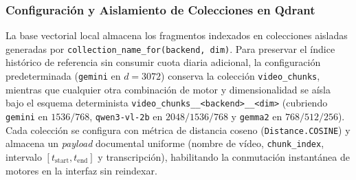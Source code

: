 \subsubsection{Configuración y Aislamiento de Colecciones en Qdrant}
La base vectorial local almacena los fragmentos indexados en colecciones aisladas generadas por \texttt{collection\_name\_for(backend, dim)}. Para preservar el índice histórico de referencia sin consumir cuota diaria adicional, la configuración predeterminada (\texttt{gemini} en $d=3072$) conserva la colección \texttt{video\_chunks}, mientras que cualquier otra combinación de motor y dimensionalidad se aísla bajo el esquema determinista \texttt{video\_chunks\_\_<backend>\_\_<dim>} (cubriendo \texttt{gemini} en $1536/768$, \texttt{qwen3-vl-2b} en $2048/1536/768$ y \texttt{gemma2} en $768/512/256$). Cada colección se configura con métrica de distancia coseno (\texttt{Distance.COSINE}) y almacena un \textit{payload} documental uniforme (nombre de vídeo, \texttt{chunk\_index}, intervalo $[t_{\text{start}}, t_{\text{end}}]$ y transcripción), habilitando la conmutación instantánea de motores en la interfaz sin reindexar.
